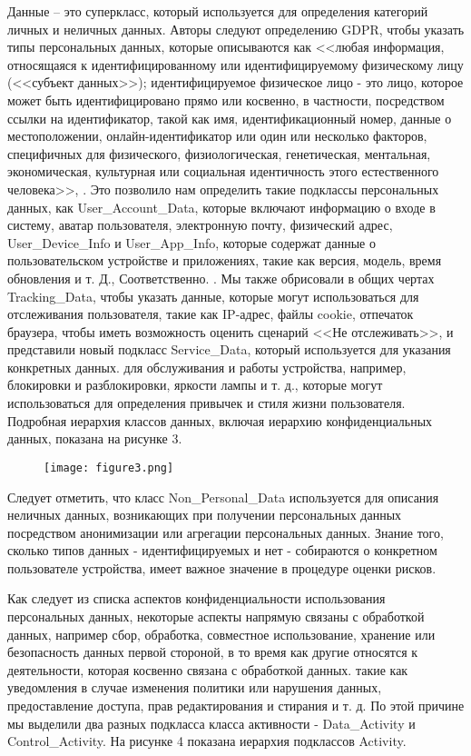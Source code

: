 \documentclass[../main]{subfiles}
\begin{document}
Данные -- это суперкласс, который используется для определения категорий личных и неличных данных. Авторы следуют определению GDPR, чтобы указать типы персональных данных, которые описываются как <<любая информация, относящаяся к идентифицированному или идентифицируемому физическому лицу (<<субъект данных>>); идентифицируемое физическое лицо - это лицо, которое может быть идентифицировано прямо или косвенно, в частности, посредством ссылки на идентификатор, такой как имя, идентификационный номер, данные о местоположении, онлайн-идентификатор или один или несколько факторов, специфичных для физического, физиологическая, генетическая, ментальная, экономическая, культурная или социальная идентичность этого естественного человека>>\cite{MDPI1}, \cite{MDPI4}. Это позволило нам определить такие подклассы персональных данных, как User\_Account\_Data, которые включают информацию о входе в систему, аватар пользователя, электронную почту, физический адрес, User\_Device\_Info и User\_App\_Info, которые содержат данные о пользовательском устройстве и приложениях, такие как версия, модель, время обновления и т. Д., Соответственно. . Мы также обрисовали в общих чертах Tracking\_Data, чтобы указать данные, которые могут использоваться для отслеживания пользователя, такие как IP-адрес, файлы cookie, отпечаток браузера, чтобы иметь возможность оценить сценарий <<Не отслеживать>>, и представили новый подкласс Service\_Data, который используется для указания конкретных данных. для обслуживания и работы устройства, например, блокировки и разблокировки, яркости лампы и т. д., которые могут использоваться для определения привычек и стиля жизни пользователя. Подробная иерархия классов данных, включая иерархию конфиденциальных данных, показана на рисунке 3.

\begin{figure}[H]
    \centering
    {\texttt{[image: figure3.png]}}
    \vspace{-\baselineskip}
\end{figure}

Следует отметить, что класс Non\_Personal\_Data используется для описания неличных данных, возникающих при получении персональных данных посредством анонимизации или агрегации персональных данных. Знание того, сколько типов данных - идентифицируемых и нет - собираются о конкретном пользователе устройства, имеет важное значение в процедуре оценки рисков.

Как следует из списка аспектов конфиденциальности использования персональных данных, некоторые аспекты напрямую связаны с обработкой данных, например сбор, обработка, совместное использование, хранение или безопасность данных первой стороной, в то время как другие относятся к деятельности, которая косвенно связана с обработкой данных. такие как уведомления в случае изменения политики или нарушения данных, предоставление доступа, прав редактирования и стирания и т. д. По этой причине мы выделили два разных подкласса класса активности - Data\_Activity и Control\_Activity. На рисунке 4 показана иерархия подклассов Activity. 
\end{document}
